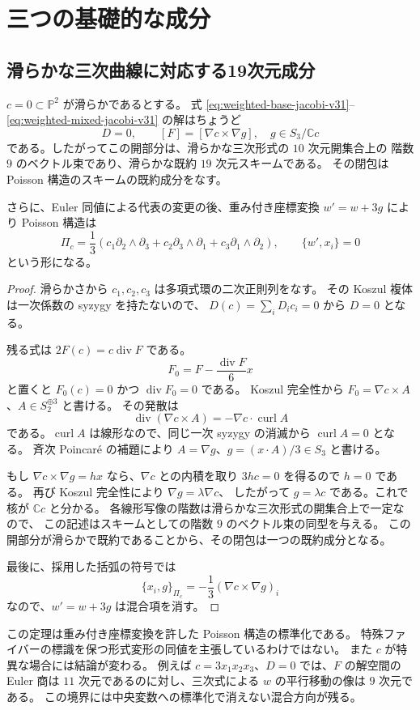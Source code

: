 \section{三つの基礎的な成分}
\label{sec:basic-components-v32}
\subsection{滑らかな三次曲線に対応する19次元成分}

\begin{theorem}[滑らかな三次曲線上の標準形]
\label{thm:smooth-cubic-component-v31}
$c=0\subset\mathbb P^2$ が滑らかであるとする。
式 \eqref{eq:weighted-base-jacobi-v31}--\eqref{eq:weighted-mixed-jacobi-v31}
の解はちょうど
\[
 D=0,\qquad [F]=[\nabla c\times\nabla g],
 \quad g\in S_3/\mathbb Cc
\]
である。したがってこの開部分は、滑らかな三次形式の $10$ 次元開集合上の
階数 $9$ のベクトル束であり、滑らかな既約 $19$ 次元スキームである。
その閉包は Poisson 構造のスキームの既約成分をなす。

さらに、Euler 同値による代表の変更の後、重み付き座標変換
$w'=w+3g$ により Poisson 構造は
\[
 \Pi_c=\frac13\left(
 c_1\partial_2\wedge\partial_3+
 c_2\partial_3\wedge\partial_1+
 c_3\partial_1\wedge\partial_2\right),
 \qquad\{w',x_i\}=0
\]
という形になる。
\end{theorem}

\begin{proof}
滑らかさから $c_1,c_2,c_3$ は多項式環の二次正則列をなす。
その Koszul 複体は一次係数の syzygy を持たないので、
$D(c)=\sum_iD_i c_i=0$ から $D=0$ となる。

残る式は $2F(c)=c\operatorname{div}F$ である。
\[
 F_0=F-\frac{\operatorname{div}F}{6}x
\]
と置くと $F_0(c)=0$ かつ $\operatorname{div}F_0=0$ である。
Koszul 完全性から $F_0=\nabla c\times A$、$A\in S_2^{\oplus3}$ と書ける。
その発散は
\[
 \operatorname{div}(\nabla c\times A)
 =-\nabla c\cdot\operatorname{curl}A
\]
である。$\operatorname{curl}A$ は線形なので、同じ一次 syzygy の消滅から
$\operatorname{curl}A=0$ となる。
斉次 Poincar\'e の補題により
$A=\nabla g$、$g=(x\cdot A)/3\in S_3$ と書ける。

もし $\nabla c\times\nabla g=hx$ なら、$\nabla c$ との内積を取り
$3hc=0$ を得るので $h=0$ である。
再び Koszul 完全性により $\nabla g=\lambda\nabla c$、
したがって $g=\lambda c$ である。これで核が $\mathbb Cc$ と分かる。
各線形写像の階数は滑らかな三次形式の開集合上で一定なので、
この記述はスキームとしての階数 $9$ のベクトル束の同型を与える。
この開部分が滑らかで既約であることから、その閉包は一つの既約成分となる。

最後に、採用した括弧の符号では
\[
 \{x_i,g\}_{\Pi_c}
 =-\frac13(\nabla c\times\nabla g)_i
\]
なので、$w'=w+3g$ は混合項を消す。
\end{proof}

この定理は重み付き座標変換を許した Poisson 構造の標準化である。
特殊ファイバーの標識を保つ形式変形の同値を主張しているわけではない。
また $c$ が特異な場合には結論が変わる。
例えば $c=3x_1x_2x_3$、$D=0$ では、$F$ の解空間の Euler 商は
$11$ 次元であるのに対し、三次式による $w$ の平行移動の像は $9$ 次元である。
この境界には中央変数への標準化で消えない混合方向が残る。

